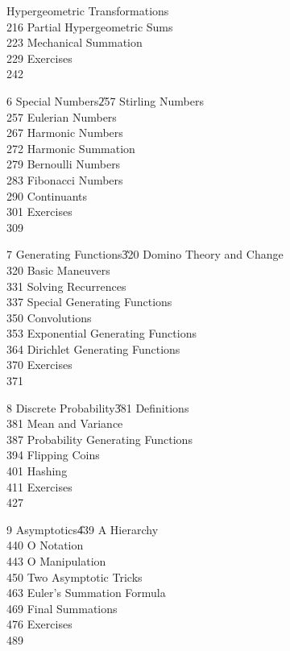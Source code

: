 Hypergeometric Transformations\\216
Partial Hypergeometric Sums\\223
Mechanical Summation\\229
\itemitem{}Exercises\\242
\item6 Special Numbers\|257
Stirling Numbers\\257
Eulerian Numbers\\267
Harmonic Numbers\\272
Harmonic Summation\\279
Bernoulli Numbers\\283
Fibonacci Numbers\\290
Continuants\\301
\itemitem{}Exercises\\309
\item7 Generating Functions\|320
Domino Theory and Change\\320
Basic Maneuvers\\331
Solving Recurrences\\337
Special Generating Functions\\350
Convolutions\\353
Exponential Generating Functions\\364
Dirichlet Generating Functions\\370
\itemitem{}Exercises\\371
\item8 Discrete Probability\|381
Definitions\\381
Mean and Variance\\387
Probability Generating Functions\\394
Flipping Coins\\401
Hashing\\411
\itemitem{}Exercises\\427
\item9 Asymptotics\|439
A Hierarchy\\440
O Notation\\443
O Manipulation\\450
Two Asymptotic Tricks\\463
Euler's Summation Formula\\469
Final Summations\\476
\itemitem{}Exercises\\489

